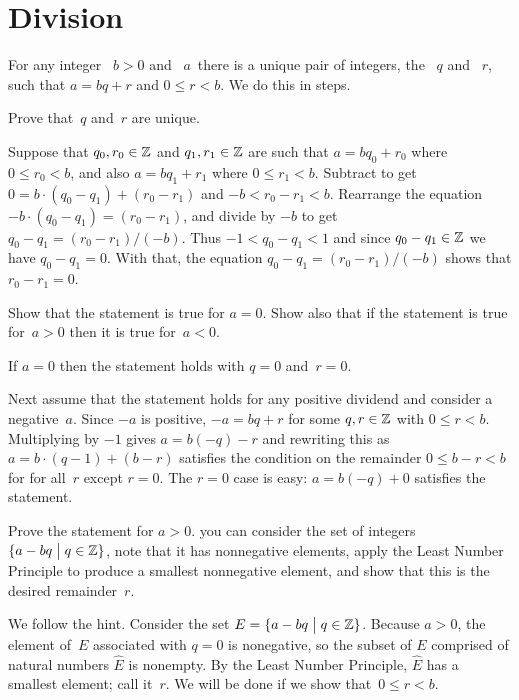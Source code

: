 \documentclass{test}  %
\begin{document}
\section{Division}
\begin{problem}  For any integer 
~$b>0$ and ~$a\,$ there is a unique pair of
integers, the ~$q$ and ~$r$,
such that $a=bq+r$ and $0\leq r<b$.
We do this in steps.
\begin{exes} 
\begin{exercise}
  Prove that~$q$ and~$r$ are unique.
\end{exercise}
\begin{answer}
  Suppose that $q_0,r_0\in\mathbb{Z}$ and $q_1,r_1\in\mathbb{Z}$ are such that
  $a=bq_0+r_0$ where $0\leq r_0<b$, and also
  $a=bq_1+r_1$ where $0\leq r_1<b$.
  Subtract to get $0=b\cdot(q_0-q_1)+(r_0-r_1)$ and $-b<r_0-r_1<b$.
  Rearrange the equation $-b\cdot(q_0-q_1)=(r_0-r_1)$,
  and divide by $-b$ to get $q_0-q_1=(r_0-r_1)/(-b)$.
  Thus  $-1<q_0-q_1<1$ and since $q_0-q_1\in\mathbb{Z}$ we have $q_0-q_1=0$.
  With that, the equation $q_0-q_1=(r_0-r_1)/(-b)$ shows that $r_0-r_1=0$.
\end{answer}
\begin{exercise}
   Show that the statement is true for $a=0$.
  Show also that if the statement is true for~$a>0$ then it is true
  for~$a<0$.
\end{exercise} 
\begin{answer}
  If $a=0$ then the statement holds with $q=0$ and~$r=0$.

  Next assume that the statement holds for any positive dividend
  and consider a negative~$a$.
  Since $-a$ is positive, $-a=bq+r$ for some 
  $q,r\in\mathbb{Z}$ with $0\leq r<b$.
  Multiplying by $-1$ gives $a=b(-q)-r$ and
  rewriting this as $a=b\cdot(q-1)+(b-r)$ satisfies the condition on the
  remainder $0\leq b-r<b$ for for all~$r$ except $r=0$.
  The $r=0$ case is easy: $a=b(-q)+0$ satisfies the statement.   
\end{answer}
\begin{exercise} 
  Prove the statement for $a>0$.
  \hint you can consider the set of integers $\{a-bq \bigm| q\in\mathbb{Z}\}$,
  note that it has nonnegative elements,
  apply the Least Number Principle
  to produce a smallest nonnegative element, and show that this is the desired
  remainder~$r$.
\end{exercise}
\begin{answer}
  We follow the hint.
  Consider the set $E=\{a-bq \bigm| q\in\mathbb{Z}\}$.
  Because $a>0$, the element of~$E$ associated with $q=0$ is nonegative,
  so the subset of $E$ comprised of natural numbers $\hat{E}$ is nonempty.
  By the Least Number Principle, $\hat{E}$ has a smallest element;
  call it~$r$.
  We will be done if we show that~$0\leq r<b$.


\end{answer}
\end{exes}
\end{problem}
\end{document}

